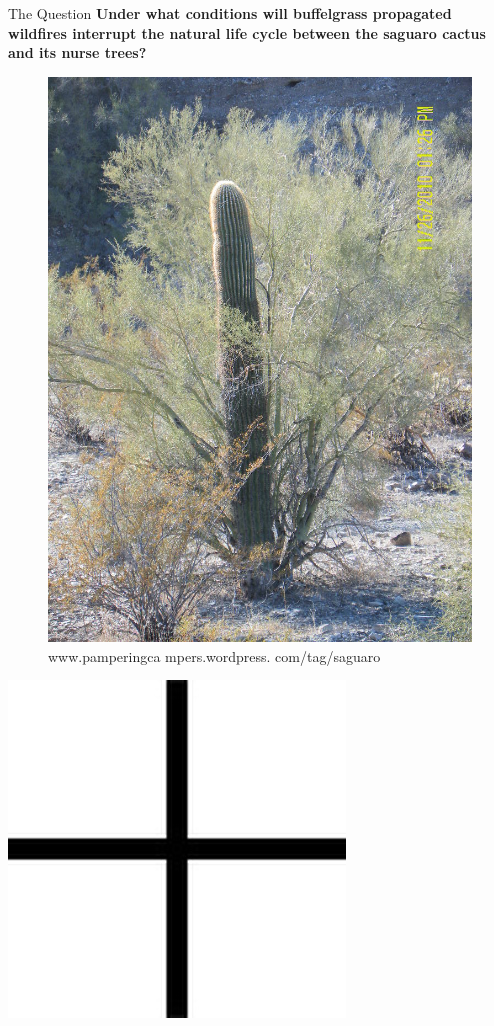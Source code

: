 \documentclass{beamer}
\begin{document}
\begin{frame}{The Question}
\textbf {Under what conditions will buffelgrass propagated wildfires interrupt the natural life cycle between the saguaro cactus and its nurse trees?}
\newline\newline
\begin{minipage}{0.15\textwidth}
\begin{figure}
\includegraphics[scale=.42]{SaguaroandNurse1.jpg}\\
\tiny{www.pamperingca
mpers.wordpress. com/tag/saguaro}
\end{figure}
\end{minipage}
\hfill
\begin{minipage}{0.05\textwidth}
\includegraphics[scale = 0.1]{plus-sign.jpg}

\end{minipage}
\end{frame}
\end{document}
